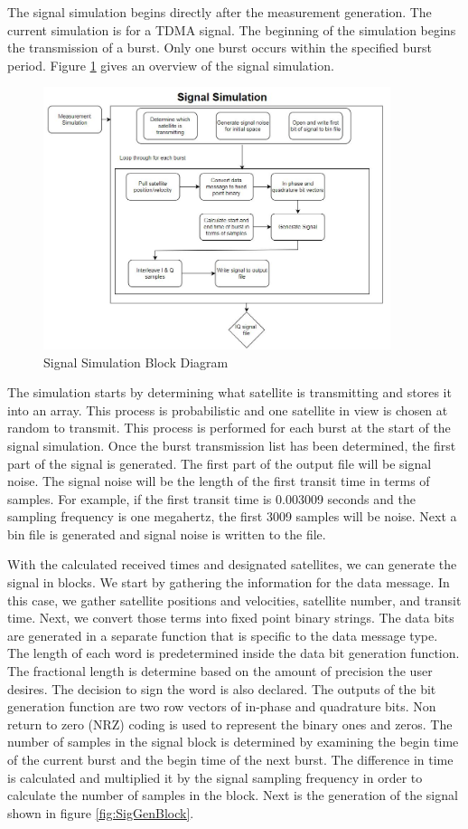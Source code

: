 \documentclass[12pt]{report}
\begin{document}
The signal simulation begins directly after the measurement generation. The current simulation is for a TDMA signal. The beginning of the simulation begins the transmission of a burst. Only one burst occurs within the specified burst period. Figure \ref{fig:SigSimBlock} gives an overview of the signal simulation.

\begin{figure}[h]
    \centering
    \includegraphics[width=4in]{SignalSimBlock}
    \caption{Signal Simulation Block Diagram}
    \label{fig:SigSimBlock}
\end{figure}



The simulation starts by determining what satellite is transmitting and stores it into an array. This process is probabilistic and one satellite in view is chosen at random to transmit. This process is performed for each burst at the start of the signal simulation. Once the burst transmission list has been determined, the first part of the signal is generated. The first part of the output file will be signal noise. The signal noise will be the length of the first transit time in terms of samples. For example, if the first transit time is 0.003009 seconds and the sampling frequency is one megahertz, the first 3009 samples will be noise. Next a bin file is generated and signal noise is written to the file. 

With the calculated received times and designated satellites, we can generate the signal in blocks. We start by gathering the information for the data message. In this case, we gather satellite positions and velocities, satellite number, and transit time. Next, we convert those terms into fixed point binary strings. The data bits are generated in a separate function that is specific to the data message type. The length of each word is predetermined inside the data bit generation function.  The fractional length is determine based on the amount of precision the user desires. The decision to sign the word is also declared.  The outputs of the bit generation function are two row vectors of in-phase and quadrature bits. Non return to zero (NRZ) coding is used to represent the binary ones and zeros. The number of samples in the signal block is determined by examining the begin time of the current burst and the begin time of the next burst. The difference in time is calculated and multiplied it by the signal sampling frequency in order to calculate the number of samples in the block. Next is the generation of the signal shown in figure \ref{fig:SigGenBlock}. 
\end{document}
